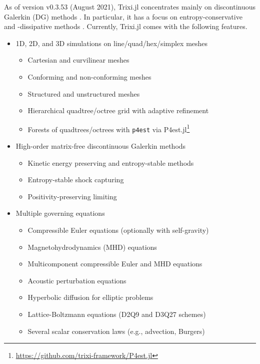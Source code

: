 \documentclass{juliacon}
\makeatletter
\newcommand{\eg}[0]{{e.g.\@}\xspace}
\newcommand{\trixi}{Trixi.jl\xspace}
\makeatother
\begin{document}
As of version v0.3.53 (August 2021), \trixi concentrates mainly on discontinuous
Galerkin (DG) methods \cite{hesthaven2007nodal, kopriva2009implementing}.
In particular, it has a focus on entropy-conservative and -dissipative methods
\cite{tadmor1987numerical, lefloch2002fully, fisher2013discretely,
ranocha2018comparison, chen2017entropy}. Currently, \trixi comes with the
following features.
\begin{itemize}
  \item 1D, 2D, and 3D simulations on line/quad/hex/simplex meshes
  \begin{itemize}
    \item Cartesian and curvilinear meshes
    \item Conforming and non-conforming meshes
    \item Structured and unstructured meshes
    \item Hierarchical quadtree/octree grid with adaptive refinement
    \item Forests of quadtrees/octrees with \texttt{p4est} \cite{burstedde2011p4est}
          via P4est.jl\footnote{\url{https://github.com/trixi-framework/P4est.jl}}
  \end{itemize}

  \item High-order matrix-free discontinuous Galerkin methods
  \begin{itemize}
    \item Kinetic energy preserving and entropy-stable methods
    \item Entropy-stable shock capturing
    \item Positivity-preserving limiting
  \end{itemize}

  \item Multiple governing equations
  \begin{itemize}
    \item Compressible Euler equations (optionally with self-gravity)
    \item Magnetohydrodynamics (MHD) equations
    \item Multicomponent compressible Euler and MHD equations
    \item Acoustic perturbation equations
    \item Hyperbolic diffusion for elliptic problems
    \item Lattice-Boltzmann equations (D2Q9 and D3Q27 schemes)
    \item Several scalar conservation laws (\eg, advection, Burgers)
  \end{itemize}


\end{itemize}
\end{document}
